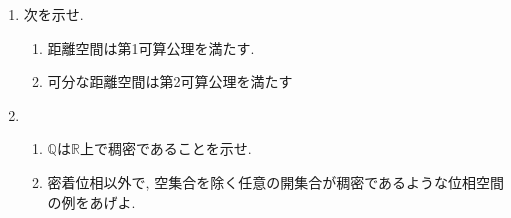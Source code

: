 \documentclass[dvipdfmx,a4paper,11pt]{article}
\newcommand{\R}{\mathbb{R}}
\newcommand{\Q}{\mathbb{Q}}
\theoremstyle{definition}
\begin{document}
\begin{enumerate}[ label=\textbf{問}4.\arabic*]
\item 次を示せ.	
	\begin{enumerate}
	\item 距離空間は第1可算公理を満たす.
	\item 可分な距離空間は第2可算公理を満たす
	\end{enumerate}

	
\item  %
	\begin{enumerate}
	\item $\Q$は$\R$上で稠密であることを示せ.
	\item 密着位相以外で, 空集合を除く任意の開集合が稠密であるような位相空間の例をあげよ.
	\end{enumerate}
	

\end{enumerate}
\end{document}
